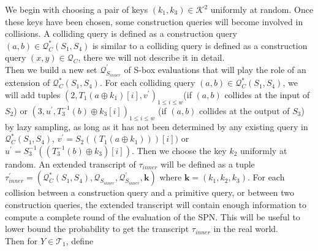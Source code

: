 We begin with choosing a pair of keys $\left(k_{1}, k_{3}\right) \in \mathcal{K}^{2}$ uniformly at random. Once these keys have been chosen, some construction queries will become involved in collisions. A colliding query is defined as a construction query $(a, b) \in \mathcal{Q}_{C}^{*}\left(S_{1}, S_{4}\right)$ is similar to a colliding query is defined as a construction query $(x, y) \in \mathcal{Q}_{C}$, there we will not describe it in detail.\\

Then we build a new set $\mathcal{Q}_{S_{inner}}^{\prime}$ of S-box evaluations that will play the role of an extension of $\mathcal{Q}_{C}^{*}\left(S_{1}, S_{4}\right)$. For each colliding query $(a, b) \in \mathcal{Q}_{C}^{*}\left(S_{1}, S_{4}\right)$, we will add tuples $\left(2, T_1\left(a \oplus k_{1}\right)[i], v^{\prime}\right)_{1 \leq i \leq w}$(if $(a, b)$ collides at the input of $S_2$) or $\left(3, u^{\prime}, T_{3}^{-1}\left(b\right) \oplus k_{3}[i]\right)_{1 \leq i \leq w}$ (if $(a, b)$ collides at the output of $S_3$) by lazy sampling, as long as it has not been determined by any existing query in $\mathcal{Q}_{C}^{*}\left(S_{1}, S_{4}\right)$, $v^{\prime}=S_{2}(\left(T_1\left(a \oplus k_{1}\right)\right))[i])$ or $u^{\prime}=S_{3}^{-1}(\left(T_{3}^{-1}\left(b\right) \oplus k_{3}\right)[i])$. Then we choose the key $k_2$ uniformly at random. An extended transcript of $\tau_{inner}$ will be defined as a tuple $\tau_{inner}^{\prime}=\left(\mathcal{Q}_{C}^{*}\left(S_{1}, S_{4}\right), \mathcal{Q}_{S_{inner}}, \mathcal{Q}_{S_{inner}}^{\prime}, \mathbf{k}\right)$ where $\mathbf{k}=\left(k_{1}, k_{2}, k_{3}\right)$. For each collision between a construction query and a primitive query, or between two construction queries, the extended transcript will contain enough information to compute a complete round of the evaluation of the SPN. This will be useful to lower bound the probability to get the transcript $\tau_{inner}$ in the real world.\\

Then for $Y \in \mathcal{T}_{1}$, define


